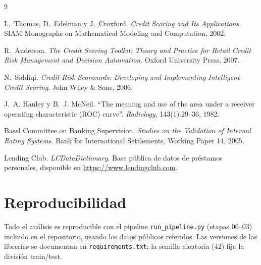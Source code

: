 \documentclass[11pt,letterpaper]{article}
\begin{document}
\begin{thebibliography}{9}
\raggedright
\small

L.~Thomas, D.~Edelman y J.~Croxford.
\emph{Credit Scoring and Its Applications}. SIAM Monographs on Mathematical
Modeling and Computation, 2002.

R.~Anderson.
\emph{The Credit Scoring Toolkit: Theory and Practice for Retail Credit Risk
Management and Decision Automation}. Oxford University Press, 2007.

N.~Siddiqi.
\emph{Credit Risk Scorecards: Developing and Implementing Intelligent Credit
Scoring}. John Wiley \& Sons, 2006.

J.~A. Hanley y B.~J. McNeil.
``The meaning and use of the area under a receiver operating characteristic
(ROC) curve''. \emph{Radiology}, 143(1):29--36, 1982.

Basel Committee on Banking Supervision.
\emph{Studies on the Validation of Internal Rating Systems}. Bank for
International Settlements, Working Paper 14, 2005.

Lending Club.
\emph{LCDataDictionary}. Base pública de datos de préstamos personales,
disponible en \url{https://www.lendingclub.com}.

\end{thebibliography}

\section*{Reproducibilidad}

Todo el análisis es reproducible con el pipeline \texttt{run\_pipeline.py}
(etapas 00--03) incluido en el repositorio, usando los datos públicos
referidos. Las versiones de las librerías se documentan en
\texttt{requirements.txt}; la semilla aleatoria ($42$) fija la división
train/test.
\end{document}

